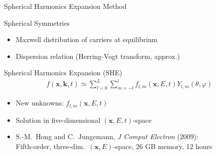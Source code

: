 \documentclass[usepdftitle=false,10pt]{beamer}
\renewcommand{\vector}[1]{\boldsymbol{#1}}
\begin{document}
\begin{frame}{Spherical Harmonics Expansion Method}

 \vspace*{-0.3cm}
  \begin{block}{Spherical Symmetries}
  \begin{itemize}
   \item Maxwell distribution of carriers at equilibrium
   \item Dispersion relation (Herring-Vogt transform, approx.)
  \end{itemize}
  \end{block}

 
     \vspace*{0.62cm}
  \begin{block}{Spherical Harmonics Expansion (SHE)}
     \vspace*{-0.5cm}
      { %
       \begin{align*}
	f(\vector x, \vector k, t) \simeq \sum_{l = 0}^L \sum_{m=-l}^l f_{l,m}(\vector x, E, t) Y_{l,m}(\theta, \varphi)
      \end{align*}}
     \vspace*{-0.5cm}
    \begin{itemize}
     \item New unknowns: $f_{l,m}(\vector x, E, t)$
     \item Solution in five-dimensional $(\vector x, E, t)$-space
     \item S.-M.~Hong and C.~Jungemann, \textit{J Comput Electron} (2009): \\
           Fifth-order, three-dim.~$(\vector x, E)$-space, 26 GB memory, 12 hours
    \end{itemize}
   \end{block}


\end{frame}
\end{document}
